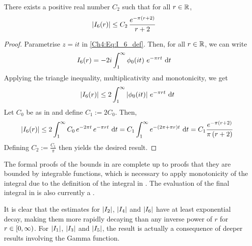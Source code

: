 \begin{boxlemma}\label{Ch4:Lemma:Bound_I6}
    There exists a positive real number $C_2$ such that for all $r \in \mathbb{R}$,
    \begin{align*}
        \left\lvert I_6(r) \right\rvert &\leq C_2 \, \frac{e^{-\pi \left( r + 2 \right)}}{r + 2}
    \end{align*}
\end{boxlemma}
\begin{proof}
    Parametrise $z = it$ in \eqref{Ch4:Eq:I_6_def}. Then, for all $r \in \mathbb{R}$, we can write
    \begin{align*}
        I_6(r) &= -2i \int_{1}^{\infty} \phi_0\!\left( it \right) \, e^{- \pi r t} \, \operatorname{d}\!{t}
    \end{align*}
    Applying the triangle inequality, multiplicativity and monotonicity, we get
    \begin{align*}
        \left\lvert I_6(r) \right\rvert \leq 2\int_{1}^{\infty}
            \left\lvert \phi_0\!\left( it \right) \right\rvert \,
            e^{-\pi r t} \,
            \operatorname{d}\!{t}
    \end{align*}
    Let $C_0$ be as in  and define $C_1 := 2 C_0$. Then,
    \begin{align*}
        \left\lvert I_6(r) \right\rvert \leq 2\int_{1}^{\infty}
            C_0 \,
            e^{-2 \pi t} \,
            e^{-\pi r t} \,
            \operatorname{d}\!{t}
        = C_1 \int_{1}^{\infty} e^{-\left( 2\pi + \pi r \right)t} \, \operatorname{d}\!{t}
        = C_1 \frac{e^{-\pi\left( r + 2 \right)}}{\pi\left( r + 2 \right)}
    \end{align*}
    Defining $C_2 := \frac{C_1}{\pi}$ then yields the desired result.
\end{proof}

The formal proofs of the bounds in  are complete up to proofs that they are bounded by integrable functions, which is necessary to apply monotonicity of the integral due to the definition of the integral in \mathlib. The evaluation of the final integral in  is also currently a \sorry.

It is clear that the estimates for $\left\lvert I_2 \right\rvert$, $\left\lvert I_4 \right\rvert$ and $\left\lvert I_6 \right\rvert$ have at least exponential decay, making them more rapidly decaying than any inverse power of $r$ for $r \in \left[0, \infty\right)$. For $\left\lvert I_1 \right\rvert$, $\left\lvert I_3 \right\rvert$ and $\left\lvert I_5 \right\rvert$, the result is actually a consequence of deeper results involving the Gamma function.

